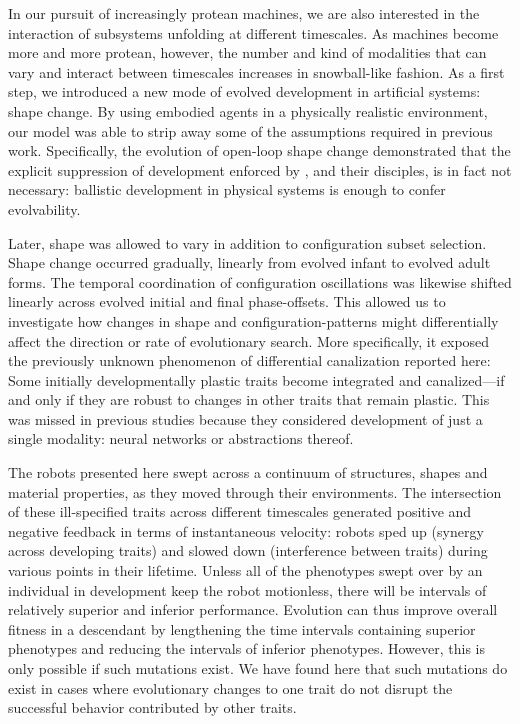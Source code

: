 In our pursuit of 
increasingly protean machines,
we are also interested in the interaction of subsystems unfolding at different timescales.
As machines become more and more protean, however, the number and kind of modalities that can vary and interact between timescales increases in snowball-like fashion.
As a first step,
we introduced
a new mode of evolved development in artificial systems: shape change.
By using embodied agents in a physically realistic environment,
our model was able to strip away some of the assumptions required in previous work.
Specifically,
the evolution of open-loop shape change demonstrated that the explicit suppression of development enforced by \citet{hinton1987learning}, and their disciples,
is in fact not necessary: ballistic development in physical systems is enough to confer evolvability.


Later, shape was allowed to vary in addition to configuration subset selection.
Shape change occurred gradually, linearly from evolved infant to evolved adult forms.
The temporal coordination of configuration oscillations was likewise shifted linearly across evolved initial and final phase-offsets.
This allowed us to investigate how changes in shape and configuration-patterns might differentially affect the direction or rate of evolutionary search.
More specifically, it exposed the previously unknown phenomenon of differential canalization reported here:
Some initially developmentally plastic traits become integrated and canalized---if and only if they are robust to changes in other traits that remain plastic.
This was missed in previous studies because they considered development of just a single modality: neural networks or abstractions thereof.

The robots presented here 
swept across a continuum of structures, shapes and material properties,
as they
moved through their environments.
The intersection of these ill-specified traits across different timescales generated positive and negative feedback in terms of instantaneous velocity: 
robots sped up (synergy across developing traits) and slowed down (interference between traits) during various points in their lifetime.
Unless all of the phenotypes swept over by an individual in development keep the robot motionless, there will be intervals of relatively superior and inferior performance.
Evolution can thus improve overall fitness in a descendant by lengthening the time intervals containing superior phenotypes and reducing the intervals of inferior phenotypes. 
However, this is only possible if such mutations exist.
We have found here that such mutations do exist in cases where evolutionary changes
to one trait do not disrupt the successful behavior contributed
by other traits.

